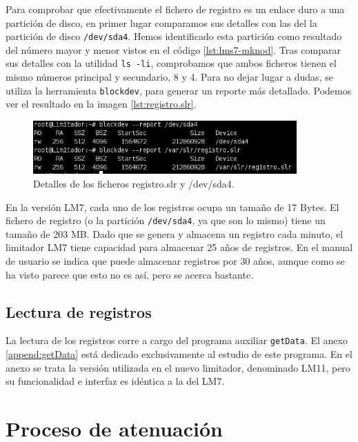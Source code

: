 Para comprobar que efectivamente el fichero de registro es un enlace duro a una partición de disco, en primer lugar comparamos sus detalles con las del la partición de disco \verb|/dev/sda4|. Hemos identificado esta partición como resultado del número mayor y menor vistos en el código \ref{lst:lms7-mknod}. Tras comparar sus detalles con la utilidad \verb|ls -li|, comprobamos que ambos ficheros tienen el mismo números principal y secundario, 8 y 4. Para no dejar lugar a dudas, se utiliza la herramienta \verb|blockdev|, para generar un reporte más detallado. Podemos ver el resultado en la imagen \ref{lst:registro.slr}.

\begin{figure}[h]
    \centering
    \includegraphics[width=0.9\textwidth]{imagenes/lms7-registro-slr.jpg}
    \caption{Detalles de los ficheros registro.slr y /dev/sda4.}
    \label{img:registro.slr}
\end{figure}

En la versión LM7, cada uno de los registros ocupa un tamaño de 17 Bytes. El fichero de registro (o la partición \verb|/dev/sda4|, ya que son lo mismo) tiene un tamaño de 203 MB. Dado que se genera y almacena un registro cada minuto, el limitador LM7 tiene capacidad para almacenar 25 años de registros. En el manual de usuario se indica que puede almacenar registros por 30 años, aunque como se ha visto parece que esto no es así, pero se acerca bastante.


\subsection{Lectura de registros}

La lectura de los registros corre a cargo del programa auxiliar \verb|getData|. El anexo \ref{append:getData} está dedicado exclusivamente al estudio de este programa. En el anexo se trata la versión utilizada en el nuevo limitador, denominado LM11, pero su funcionalidad e interfaz es idéntica a la del LM7.


\clearpage
\section{Proceso de atenuación}

